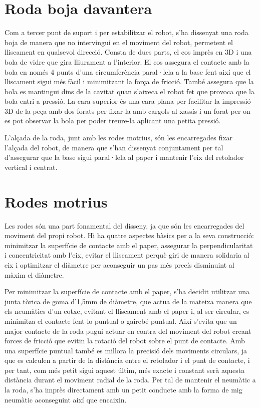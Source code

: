 \section{Roda boja davantera}

Com a tercer punt de suport i per estabilitzar el robot, s’ha dissenyat una roda boja de manera que no intervingui en el moviment del robot, permetent el lliscament en qualsevol direcció. Consta de dues parts, el cos imprès en 3D i una bola de vidre que gira lliurament a l'interior. El cos assegura el contacte amb la bola en només 4 punts d’una circumferència paral·lela a la base fent així que el lliscament sigui més fàcil i minimitzant la força de fricció. També assegura que la bola es mantingui dins de la cavitat quan s’aixeca el robot fet que provoca que la bola entri a pressió. La cara superior és una cara plana per facilitar la impressió 3D de la peça amb dos forats per fixar-la amb cargols al xassís i un forat per on es pot observar la bola per poder treure-la aplicant una petita pressió. 

L’alçada de la roda, junt amb les rodes motrius, són les encarregades fixar l’alçada del robot, de manera que s’han dissenyat conjuntament per tal d’assegurar que la base sigui paral·lela al paper i mantenir l’eix del retolador vertical i centrat. 

\section{Rodes motrius}

Les rodes són una part fonamental del disseny, ja que són les encarregades del moviment del propi robot. Hi ha quatre aspectes bàsics per a la seva construcció: minimitzar la superfície de contacte amb el paper, assegurar la perpendicularitat i concentricitat amb l’eix, evitar el lliscament perquè giri de manera solidaria al eix i optimitzar el diàmetre per aconseguir un pas més precís disminuint al màxim el diàmetre. 

Per minimitzar la superfície de contacte amb el paper, s’ha decidit utilitzar una junta tòrica de goma d’1,5mm de diàmetre, que actua de la mateixa manera que els neumàtics d’un cotxe, evitant el lliscament amb el paper i, al ser circular, es minimitza el contacte fent-lo puntual o gairebé puntual. Així s’evita que un major contacte de la roda pugui actuar en contra del moviment del robot creant forces de fricció que evitin la rotació del robot sobre el punt de contacte. Amb una superfície puntual també es millora la precisió dels moviments circulars, ja que es calculen a partir de la distància entre el retolador i el punt de contacte, i per tant, com més petit sigui aquest últim, més exacte i constant serà aquesta distància durant el moviment radial de la roda. Per tal de mantenir el neumàtic a la roda, s’ha imprès directament amb un petit conducte amb la forma de mig neumàtic aconseguint així que encaixin. 

